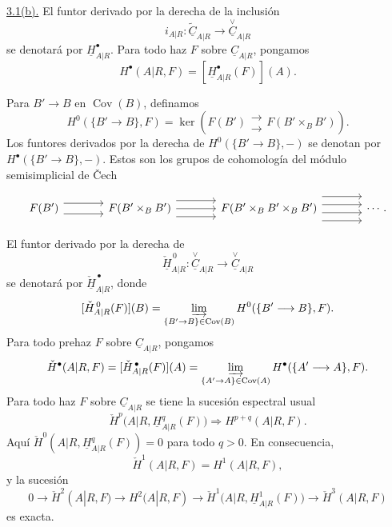 \underline{3.1(b).} El funtor derivado por la derecha de la inclusión
\[
 i_{A|R}:\widetilde{\underline C}_{A|R}
 \longrightarrow\overset{\vee}{\underline C}_{A|R}
\]
se denotará por $\underline H^{\bullet}_{A|R}$. Para todo haz $F$ sobre
$\underline C_{A|R}$, pongamos
\[
 H^{\bullet}(A|R,F)=
 [\underline H^{\bullet}_{A|R}(F)](A).
\]

Para $B'\longrightarrow B$ en $\operatorname{Cov}(B)$, definamos
\[
 H^0(\{B'\longrightarrow B\},F)=
 \ker\!\left(
 F(B')\mathrel{\substack{\longrightarrow\\[-.6ex]\longrightarrow}}
 F(B'\mathbin{\times_B}B')
 \right).
\]
Los funtores derivados por la derecha de
$H^0(\{B'\longrightarrow B\},-)$ se denotan por
$H^{\bullet}(\{B'\longrightarrow B\},-)$. Estos son
los grupos de cohomología del módulo semisimplicial de \v{C}ech


\[
\begin{tikzcd}[column sep=large]
 F(B')
   \arrow[r,shift left=2] \arrow[r,shift right=2]
 & F(B'\times_BB')
   \arrow[r,shift left=3] \arrow[r] \arrow[r,shift right=3]
 & F(B'\times_BB'\times_BB')
   \arrow[r,shift left=4.5] \arrow[r,shift left=1.5]
   \arrow[r,shift right=1.5] \arrow[r,shift right=4.5]
 & \cdots .
\end{tikzcd}
\]

El funtor derivado por la derecha de
\[
 \check{\underline H}^{\,0}_{A|R}:
 \overset{\vee}{\underline C}_{A|R}
 \longrightarrow\overset{\vee}{\underline C}_{A|R}
\]
se denotará por $\check{\underline H}^{\,\bullet}_{A|R}$, donde
\[
 [\check{\underline H}^{\,0}_{A|R}(F)](B)=
 \varinjlim_{\{B'\to B\}\in\operatorname{Cov}(B)}
 H^0(\{B'\longrightarrow B\},F).
\]
Para todo prehaz $F$ sobre $\underline C_{A|R}$, pongamos
\[
 \check H^{\bullet}(A|R,F)=
 [\check{\underline H}^{\,\bullet}_{A|R}(F)](A)=
 \varinjlim_{\{A'\to A\}\in\operatorname{Cov}(A)}
 H^{\bullet}(\{A'\longrightarrow A\},F).
\]
Para todo haz $F$ sobre $\underline C_{A|R}$ se tiene la sucesión
espectral usual
\[
 \check H^p\bigl(A|R,\underline H^q_{A|R}(F)\bigr)
 \Longrightarrow H^{p+q}(A|R,F).
\]
Aquí
$\check H^0(A|R,\underline H^q_{A|R}(F))=0$ para todo $q>0$. En
consecuencia,
\[
 \check H^1(A|R,F)=H^1(A|R,F),
\]
y la sucesión
\[
 0\longrightarrow\check H^2(A|R,F)
 \longrightarrow H^2(A|R,F)
 \longrightarrow
 \check H^1\bigl(A|R,\underline H^1_{A|R}(F)\bigr)
 \longrightarrow\check H^3(A|R,F)
\]
es exacta.
